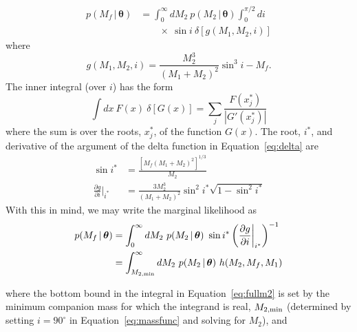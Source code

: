\documentclass[letterpaper,12pt,preprint]{aastex}
\newcommand{\given}{\,|\,}
\newcommand{\bs}[1]{\boldsymbol{#1}}
\newcommand{\degree}{^{\circ}}
\newcommand{\eqn}{Equation~}
\newcommand{\mf}{M_f}
\begin{document}
\begin{align}
    p(\mf \given \bs{\theta}) &= \int_{0}^\infty dM_2 ~p(M_2 \given \bs{\theta}) \int_0^{\pi/2} di  \nonumber \\
    & \qquad {} \times ~\sin i ~ \delta \left[g(M_1,M_2,i) \right]\label{eq:delta}
\end{align}
where
\begin{equation}
	g(M_1,M_2,i) = \frac{M_2^3}{(M_1+M_2)^2}\sin^3 i - \mf.
\end{equation}
The inner integral (over $i$) has the form
\begin{equation}
    \int dx~F(x)~\delta \left[ G(x) \right] = \sum_j \frac{F(x^*_j)}{|G'(x^*_j)|}
\end{equation}
where the sum is over the roots, $x^*_j$, of the function $G(x)$. The root, $i^*$, and derivative of the argument of the delta function in \eqn\ref{eq:delta} are 
\begin{align}
	\sin i^* &= \frac{ \left[\mf(M_1+M_2)^2 \right]^{1/3}}{M_2}\\
	\frac{\partial g}{\partial i}\bigg\rvert_{i^*} &= \frac{3M_2^3}{(M_1+M_2)^2} \sin^2 i^* \sqrt{1 - \sin^2 i^*}
\end{align}
With this in mind, we may write the marginal likelihood as
\begin{align}
	p(\mf \given \bs{\theta}) &= \int_{0}^\infty dM_2~p(M_2 \given \bs{\theta})~\sin i^* \left(\frac{\partial g}{\partial i}\bigg\rvert_{i^*}\right)^{-1}\\
	&= \int_{M_{2,{\rm min}}}^\infty dM_2~p(M_2 \given \bs{\theta})~h(M_2, \mf, M_1) \label{eq:fullm2}
\end{align}

where the bottom bound in the integral in \eqn\ref{eq:fullm2} is set by the minimum companion mass for which the integrand is real, $M_{2,{\rm min}}$ (determined by setting $i=90\degree$ in \eqn\ref{eq:massfunc} and solving for $M_2$), and
\end{document}
